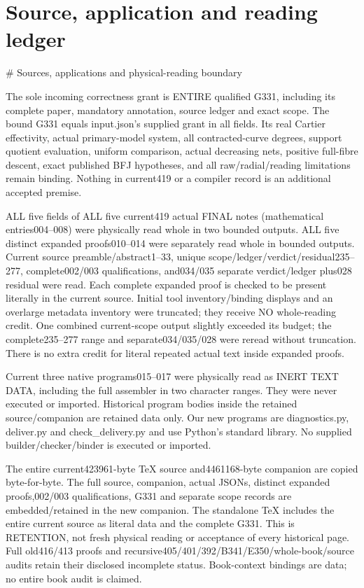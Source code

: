 \documentclass[11pt]{article}
\begin{document}
\section*{Source, application and reading ledger}
\# Sources, applications and physical-reading boundary

The sole incoming correctness grant is ENTIRE qualified G331, including its complete paper, mandatory annotation, source ledger and exact scope. The bound G331 equals input.json's supplied grant in all fields. Its real Cartier effectivity, actual primary-model system, all contracted-curve degrees, support quotient evaluation, uniform comparison, actual decreasing nets, positive full-fibre descent, exact published BFJ hypotheses, and all raw/radial/reading limitations remain binding. Nothing in current419 or a compiler record is an additional accepted premise.

ALL five fields of ALL five current419 actual FINAL notes (mathematical entries004--008) were physically read whole in two bounded outputs. ALL five distinct expanded proofs010--014 were separately read whole in bounded outputs. Current source preamble/abstract1--33, unique scope/ledger/verdict/residual235--277, complete002/003 qualifications, and034/035 separate verdict/ledger plus028 residual were read. Each complete expanded proof is checked to be present literally in the current source. Initial tool inventory/binding displays and an overlarge metadata inventory were truncated; they receive NO whole-reading credit. One combined current-scope output slightly exceeded its budget; the complete235--277 range and separate034/035/028 were reread without truncation. There is no extra credit for literal repeated actual text inside expanded proofs.

Current three native programs015--017 were physically read as INERT TEXT DATA, including the full assembler in two character ranges. They were never executed or imported. Historical program bodies inside the retained source/companion are retained data only. Our new programs are diagnostics.py, deliver.py and check\_delivery.py and use Python's standard library. No supplied builder/checker/binder is executed or imported.

The entire current423961-byte TeX source and4461168-byte companion are copied byte-for-byte. The full source, companion, actual JSONs, distinct expanded proofs,002/003 qualifications, G331 and separate scope records are embedded/retained in the new companion. The standalone TeX includes the entire current source as literal data and the complete G331. This is RETENTION, not fresh physical reading or acceptance of every historical page. Full old416/413 proofs and recursive405/401/392/B341/E350/whole-book/source audits retain their disclosed incomplete status. Book-context bindings are data; no entire book audit is claimed.
\end{document}
